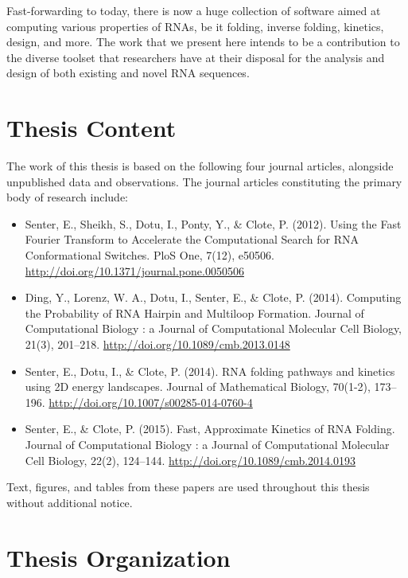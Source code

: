 Fast-forwarding to today, there is now a huge collection of software aimed at
computing various properties of RNAs, be it folding, inverse folding, kinetics,
design, and more. The work that we present here intends to be a contribution
to the diverse toolset that researchers have at their disposal for the analysis
and design of both existing and novel RNA sequences.

\section{Thesis Content}
\label{sec:intro:thesiscontent}

The work of this thesis is based on the following four journal articles, alongside
unpublished data and observations. The journal articles constituting the
primary body of research include:

\begin{itemize}
\item Senter, E., Sheikh, S., Dotu, I., Ponty, Y., \& Clote, P. (2012). Using the Fast Fourier Transform to Accelerate the Computational Search for RNA Conformational Switches. PloS One, 7(12), e50506. \url{http://doi.org/10.1371/journal.pone.0050506}
\item Ding, Y., Lorenz, W. A., Dotu, I., Senter, E., \& Clote, P. (2014). Computing the Probability of RNA Hairpin and Multiloop Formation. Journal of Computational Biology : a Journal of Computational Molecular Cell Biology, 21(3), 201–218. \url{http://doi.org/10.1089/cmb.2013.0148}
\item Senter, E., Dotu, I., \& Clote, P. (2014). RNA folding pathways and kinetics using 2D energy landscapes. Journal of Mathematical Biology, 70(1-2), 173–196. \url{http://doi.org/10.1007/s00285-014-0760-4}
\item Senter, E., \& Clote, P. (2015). Fast, Approximate Kinetics of RNA Folding. Journal of Computational Biology : a Journal of Computational Molecular Cell Biology, 22(2), 124–144. \url{http://doi.org/10.1089/cmb.2014.0193}
\end{itemize}

Text, figures, and tables from these papers are used throughout this thesis without
additional notice.

\section{Thesis Organization}
\label{sec:intro:thesisorg}

